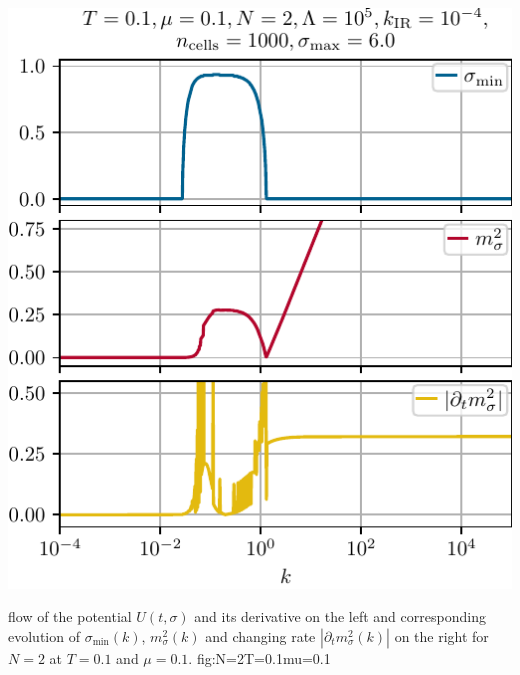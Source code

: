 	{%
		\includegraphics[width=\subcaptionFigureWidth]{gn/figures/k_N=2,T=0.1,mu=0.1.pdf}%
		\captionsetup{font=footnotesize,width=\subcaptionFigureWidth}%
		\caption{%
			\frg{} flow of the minimum $\sigma_{\mathrm{min}} ( k )$ (upper panel), the squared curvature mass $m_\sigma^2 ( k ) = \partial_\sigma u ( t, \sigma )|_{\sigma_\mathrm{min} ( t )}$ at the moving minimum $\sigma_\mathrm{min} (t)$ (middle panel), and the relative change of the squared curvature mass $| \partial_t m_\sigma^2 ( k ) |$ (lower panel) according to \cref{eq:changing_rate_mass} plotted as functions of the \rgscale{} $k ( t )$. Note, that the curvature mass at the moving minimum in the \ir{} is non-zero, $m_\sigma^2 ( t_\mathrm{IR} ) \approx 4.60\cdot10^{-4}$.
		}%
		\label{fig:k_N=2T=0.1mu=0.1}%
	}
	{%
		\frg{} flow of the potential $U(t,\sigma)$ and its derivative on the left  and corresponding evolution of $\sigma_{\mathrm{min}} ( k )$, $m_\sigma^2 ( k )$
		and changing rate $| \partial_t m_\sigma^2 ( k ) |$ on the right  for $N=2$ at $T = 0.1$ and $\mu = 0.1$.
	}%
	{fig:N=2T=0.1mu=0.1}%
